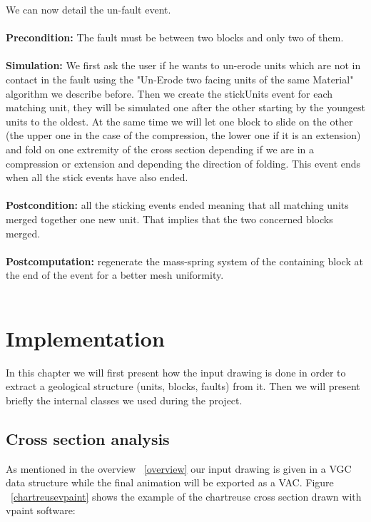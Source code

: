 \documentclass[12pt, a4paper]{report} %
\begin{document}
We can now detail the un-fault event.\\\\
\textbf{Precondition:} The fault must be between two blocks and only two of them.\\\\
\textbf{Simulation:} We first ask the user if he wants to un-erode units which are not in contact in the fault using the "Un-Erode two facing units of the same Material" algorithm we describe before. Then we create the stickUnits event for each matching unit, they will be simulated one after the other starting by the youngest units to the oldest. At the same time we will let one block to slide on the other (the upper one in the case of the compression, the lower one if it is an extension) and fold on one extremity of the cross section depending if we are in a compression or extension and depending the direction of folding. This event ends when all the stick events have also ended.\\\\
\textbf{Postcondition:} all the sticking events ended meaning that all matching units merged together one new unit. That implies that the two concerned blocks merged.\\\\
\textbf{Postcomputation:} regenerate the mass-spring system of the containing block at the end of the event for a better mesh uniformity.\\\\ 
	


 
 
\chapter{Implementation}
 In this chapter we will first present how the input drawing is done in order to extract a geological structure (units, blocks, faults) from it. Then we will present briefly the internal classes we used during the project.
 
\section{Cross section analysis}

As mentioned in the overview ~\ref{overview} our input drawing is given in a VGC data structure while the final animation will be exported as a VAC. 
Figure ~\ref{chartreusevpaint} shows the example of the chartreuse cross section drawn with vpaint software:
\end{document}
